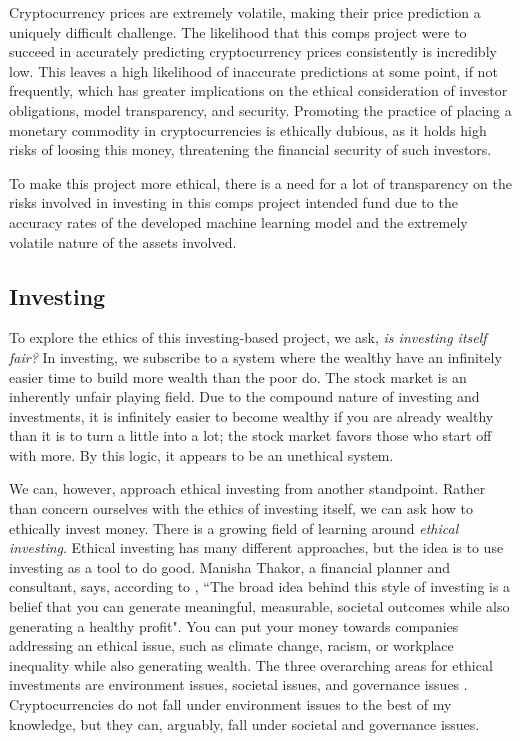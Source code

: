 \documentclass[10pt,twocolumn]{article}
\begin{document}
Cryptocurrency prices are extremely volatile, making their price prediction a uniquely difficult challenge. The likelihood that this comps project were to succeed in accurately predicting cryptocurrency prices consistently is incredibly low. This leaves a high likelihood  of inaccurate predictions at some point, if not frequently, which has greater implications on the ethical consideration of investor obligations, model transparency, and security. Promoting the practice of placing a monetary commodity in cryptocurrencies is ethically dubious, as it holds high risks of loosing this money, threatening the financial security of such investors.

To make this project more ethical, there is a need for a lot of transparency on the risks involved in investing in this comps project intended fund due to the accuracy rates of the developed machine learning model and the extremely volatile nature of the assets involved.

\subsection{Investing}

To explore the ethics of this investing-based project, we ask, \textit{is investing itself fair?} In investing, we subscribe to a system where the wealthy have an infinitely easier time to build more wealth than the poor do. The stock market is an inherently unfair playing field. Due to the compound nature of investing and investments, it is infinitely easier to become wealthy if you are already wealthy than it is to turn a little into a lot; the stock market favors those who start off with more. By this logic, it appears to be an unethical system.

We can, however, approach ethical investing from another standpoint. Rather than concern ourselves with the ethics of investing itself, we can ask how to ethically invest money. There is a growing field of learning around \textit{ethical investing}. Ethical investing has many different approaches, but the idea is to use investing as a tool to do good. Manisha Thakor, a financial planner and consultant, says, according to \textcite{LimitsOfEthicalInvesting}, ``The broad idea behind this style of investing is a belief that you can generate meaningful, measurable, societal outcomes while also generating a healthy profit". You can put your money towards companies addressing an ethical issue, such as climate change, racism, or workplace inequality while also generating wealth. The three overarching areas for ethical investments are environment issues, societal issues, and governance issues \cite{LimitsOfEthicalInvesting}. Cryptocurrencies do not fall under environment issues to the best of my knowledge, but they can, arguably, fall under societal and governance issues.
\end{document}
